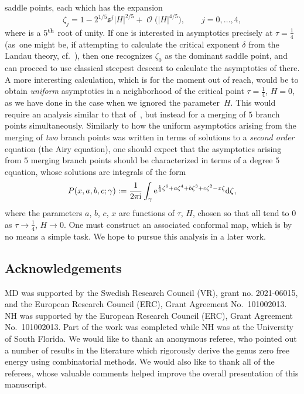 \documentclass[pdftex]{sigma}
\DeclareMathOperator{\OO}{\mathcal{O}}
\numberwithin{equation}{section}
\begin{document}
\begin{Remark}
 saddle points, each which has the expansion
 \begin{equation*}
 \zeta_j = 1 - 2^{1/5} \mathfrak{s}^j |H|^{2/5} + \OO\bigl(|H|^{4/5}\bigr),\qquad j=0,\dots,4,
 \end{equation*}
 where  is a $5^{\rm th}$ root of unity. If one is interested in asymptotics precisely at $\tau = \frac{1}{4}$ (as~one might be, if attempting to calculate the critical exponent $\delta$ from the Landau theory, cf.~\cite{Kazakov2}), then one
 recognizes $\zeta_0$ as the dominant saddle point, and can proceed to use classical steepest descent to calculate the asymptotics of
  there. A more interesting calculation, which is for the moment out of reach, would be to obtain \textit{uniform}
 asymptotics in a neighborhood of the critical point $\tau =\frac{1}{4}$, $H=0$, as we have done in the case when we ignored the parameter~$H$.
 This would require an analysis similar to that of~\cite{CFU}, but instead for a merging of $5$ branch points simultaneously. Similarly to
 how the uniform asymptotics arising from the merging of \textit{two} branch points was written in terms of solutions to a \textit{second order} equation (the Airy equation), one should expect that the asymptotics arising from $5$ merging branch points should be characterized in terms of a degree $5$ equation, whose solutions are integrals of the form
 \begin{equation*}
 P(x,a,b,c;\gamma) := \frac{1}{2\pi {\rm i}}\int_{\gamma}{\rm e}^{\frac{1}{6}\zeta^{6} + a\zeta^4 + b\zeta^3 + c\zeta^2 - x\zeta} {\rm d}\zeta,
 \end{equation*}
 where the parameters $a$, $b$, $c$, $x$ are functions of $\tau$, $H$, chosen so that all tend to $0$ as $\tau\to\frac{1}{4}$, $H\to 0$. One must construct an associated conformal map, which is by no means a simple task. We hope to pursue this analysis in a later work.
\end{Remark}

\subsection*{Acknowledgements}
MD was supported by the Swedish Research Council (VR), grant no. 2021-06015, and the European Research
Council (ERC), Grant Agreement No.~101002013. NH was supported by the European Research
Council (ERC), Grant Agreement No.~101002013. Part of the work was completed while NH was at the University of South Florida. We would like to thank an anonymous referee, who pointed out a number of results in the literature which rigorously derive the genus zero free energy using combinatorial methods. We would also like to thank all of the referees, whose valuable comments helped improve the overall presentation of this manuscript.
\end{document}
